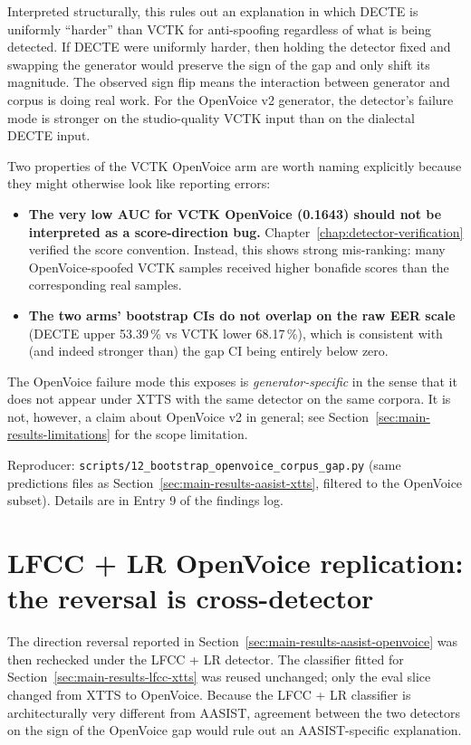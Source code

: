 Interpreted structurally, this rules out an explanation in which
DECTE is uniformly ``harder'' than VCTK for anti-spoofing
regardless of what is being detected. If DECTE were uniformly
harder, then holding the detector fixed and swapping the generator
would preserve the sign of the gap and only shift its magnitude.
The observed sign flip means the interaction between generator and
corpus is doing real work. For the OpenVoice v2 generator, the
detector's failure mode is stronger on the studio-quality VCTK
input than on the dialectal DECTE input.

Two properties of the VCTK OpenVoice arm are worth naming
explicitly because they might otherwise look like reporting errors:

\begin{itemize}
    \item \textbf{The very low AUC for VCTK OpenVoice (0.1643) should not be
        interpreted as a score-direction bug.} Chapter~\ref{chap:detector-verification} verified the
        score convention. Instead, this shows strong mis-ranking:
        many OpenVoice-spoofed VCTK samples received higher bonafide
        scores than the corresponding real samples.
    \item \textbf{The two arms' bootstrap CIs do not overlap on the raw EER
        scale} (DECTE upper 53.39\,\% vs VCTK lower 68.17\,\%), which
        is consistent with (and indeed stronger than) the gap CI being
        entirely below zero.
\end{itemize}

The OpenVoice failure mode this exposes is \emph{generator-specific}
in the sense that it does not appear under XTTS with the same
detector on the same corpora. It is not, however, a claim about
OpenVoice v2 in general; see Section~\ref{sec:main-results-limitations}
for the scope limitation.

Reproducer: \texttt{scripts/12\_bootstrap\_openvoice\_corpus\_gap.py}
(same predictions files as Section~\ref{sec:main-results-aasist-xtts}, filtered to the OpenVoice
subset). Details are in Entry 9 of the findings log.


\section{LFCC + LR OpenVoice replication: the reversal is cross-detector}
\label{sec:main-results-lfcc-openvoice}

The direction reversal reported in Section~\ref{sec:main-results-aasist-openvoice} was then rechecked
under the LFCC + LR detector. The classifier fitted for Section~\ref{sec:main-results-lfcc-xtts}
was reused unchanged; only the eval slice changed from XTTS to
OpenVoice. Because the LFCC + LR classifier is architecturally very
different from AASIST, agreement between the two detectors on the
sign of the OpenVoice gap would rule out an AASIST-specific
explanation.

